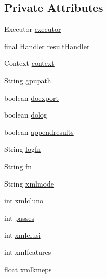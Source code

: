 \subsection*{Private Attributes}
\begin{DoxyCompactItemize}
\item 
Executor \mbox{\hyperlink{classcom_1_1example_1_1dmocl_1_1submitjobs_a07dab73512b362783390d04bd3e66490}{executor}}
\item 
final Handler \mbox{\hyperlink{classcom_1_1example_1_1dmocl_1_1submitjobs_aa692a3b05b6ade556a3976ae81638768}{result\+Handler}}
\item 
Context \mbox{\hyperlink{classcom_1_1example_1_1dmocl_1_1submitjobs_adab5cdcecba50010c8a352de8911b983}{context}}
\item 
String \mbox{\hyperlink{classcom_1_1example_1_1dmocl_1_1submitjobs_a23f103d21a2ed695a4db2cfd5f8f683a}{gpupath}}
\item 
boolean \mbox{\hyperlink{classcom_1_1example_1_1dmocl_1_1submitjobs_a00fe53b55a4c376ef881f9f7d78053f4}{doexport}}
\item 
boolean \mbox{\hyperlink{classcom_1_1example_1_1dmocl_1_1submitjobs_ad0de6e7188b1cc6646cc8e9b1b28b98a}{dolog}}
\item 
boolean \mbox{\hyperlink{classcom_1_1example_1_1dmocl_1_1submitjobs_a42dadeb403b8e36690f79c57bb5deb4a}{appendresults}}
\item 
String \mbox{\hyperlink{classcom_1_1example_1_1dmocl_1_1submitjobs_afac57bf332e5dcfb12f505eca0ee2657}{logfn}}
\item 
String \mbox{\hyperlink{classcom_1_1example_1_1dmocl_1_1submitjobs_a475937ed0767daa69a4cae65c6c6965f}{fn}}
\item 
String \mbox{\hyperlink{classcom_1_1example_1_1dmocl_1_1submitjobs_af1a274972e8b51db020c0e8a36883497}{xmlmode}}
\item 
int \mbox{\hyperlink{classcom_1_1example_1_1dmocl_1_1submitjobs_a87607f1ffd18540b6a33b86cd32a171b}{xmlcluno}}
\item 
int \mbox{\hyperlink{classcom_1_1example_1_1dmocl_1_1submitjobs_ac4b45c2a1fa35ae2e471f6d720d2f16c}{passes}}
\item 
int \mbox{\hyperlink{classcom_1_1example_1_1dmocl_1_1submitjobs_aa34ccc59b185527b61eb14f7365cbb90}{xmlclusi}}
\item 
int \mbox{\hyperlink{classcom_1_1example_1_1dmocl_1_1submitjobs_ad6d251e1cb890b66e1fe79aaf08ff042}{xmlfeatures}}
\item 
float \mbox{\hyperlink{classcom_1_1example_1_1dmocl_1_1submitjobs_a7b94da0c02916628daa6d636d0b96e9c}{xmlkmeps}}

\end{DoxyCompactItemize}

